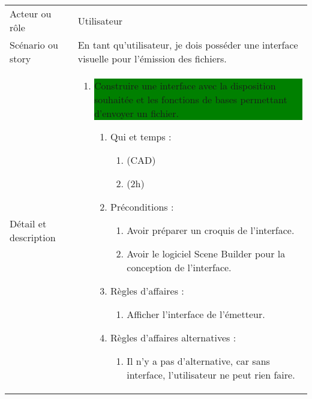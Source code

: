 \begin{longtable}{|l|p{}|}
\hline
    \rowcolor{Gray}
    \multicolumn{2}{|l|}{2} \\
\hline
    Acteur ou rôle & Utilisateur \\
\hline
    Scénario ou story & En tant qu’utilisateur, je
    dois posséder une interface
    visuelle pour l’émission des
    fichiers. \\
\hline
    Détail et description &
        \begin{enumerate}[label*=\arabic*.]
            \item \colorbox{Green}{\parbox{13cm}{Construire une interface avec
                la disposition souhaitée et les
                fonctions de bases permettant
                d’envoyer un fichier.}}
                \begin{enumerate}[label*=\arabic*.]
                                \item Qui et temps :
                                \begin{enumerate}[label*=\arabic*.]
                                    \item (CAD)
                                    \item (2h)
                                \end{enumerate}
                                \item Préconditions :
                                \begin{enumerate}[label*=\arabic*.]
                                    \item Avoir préparer un croquis de l'interface.
                                    \item Avoir le logiciel Scene Builder pour la conception de l'interface.
                                \end{enumerate}
                                \item Règles d'affaires :
                                \begin{enumerate}[label*=\arabic*.]
                                    \item Afficher l'interface de l'émetteur.
                                \end{enumerate}
                                \item Règles d'affaires alternatives :
                                \begin{enumerate}[label*=\arabic*.]
                                    \item Il n'y a pas d'alternative, car sans interface, l'utilisateur ne peut rien faire.

\end{enumerate}
\end{enumerate}
\end{enumerate}
\end{longtable}
